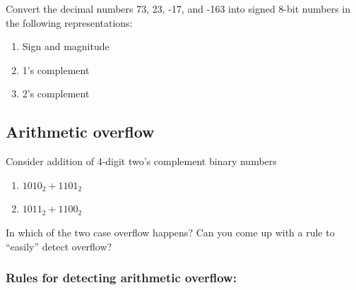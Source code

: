 \begin{prob}
  Convert the decimal numbers 73, 23, -17, and -163 into signed 8-bit numbers in the
  following representations:
  \begin{enumerate}
    \item Sign and magnitude
    \item 1’s complement
    \item 2’s complement
  \end{enumerate}
\end{prob}
\vspace{20em}


\subsection{Arithmetic overflow}
\begin{prob}
  Consider addition of 4-digit two's complement binary numbers
  \begin{enumerate}
  \item $1010_2 + 1101_2$
  \item $1011_2 + 1100_2$
  \end{enumerate}
  In which of the two case overflow happens? Can you come up with a rule to ``easily'' detect overflow?
\end{prob}
\vspace{20em}

\subsubsection{Rules for detecting arithmetic overflow:}


